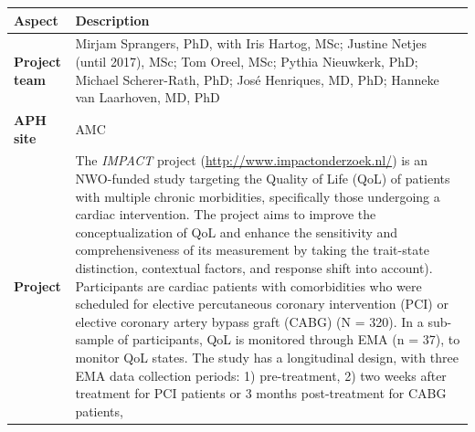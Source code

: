 \documentclass[]{book}
\begin{document}
 

\begin{longtable}[]{@{}ll@{}}
\toprule
\begin{minipage}[b]{0.25\columnwidth}\raggedright\strut
\textbf{Aspect}\strut
\end{minipage} & \begin{minipage}[b]{0.69\columnwidth}\raggedright\strut
\textbf{Description}\strut
\end{minipage}\tabularnewline
\midrule
\endhead
\begin{minipage}[t]{0.25\columnwidth}\raggedright\strut
\textbf{Project team}\strut
\end{minipage} & \begin{minipage}[t]{0.69\columnwidth}\raggedright\strut
Mirjam Sprangers, PhD, with Iris Hartog, MSc; Justine Netjes (until
2017), MSc; Tom Oreel, MSc; Pythia Nieuwkerk, PhD; Michael Scherer-Rath,
PhD; José Henriques, MD, PhD; Hanneke van Laarhoven, MD, PhD\strut
\end{minipage}\tabularnewline
\begin{minipage}[t]{0.25\columnwidth}\raggedright\strut
\textbf{APH site}\strut
\end{minipage} & \begin{minipage}[t]{0.69\columnwidth}\raggedright\strut
AMC\strut
\end{minipage}\tabularnewline
\begin{minipage}[t]{0.25\columnwidth}\raggedright\strut
\textbf{Project}\strut
\end{minipage} & \begin{minipage}[t]{0.69\columnwidth}\raggedright\strut
The \emph{IMPACT} project (\url{http://www.impactonderzoek.nl/}) is an
NWO-funded study targeting the Quality of Life (QoL) of patients with
multiple chronic morbidities, specifically those undergoing a cardiac
intervention. The project aims to improve the conceptualization of QoL
and enhance the sensitivity and comprehensiveness of its measurement by
taking the trait-state distinction, contextual factors, and response
shift into account). Participants are cardiac patients with
comorbidities who were scheduled for elective percutaneous coronary
intervention (PCI) or elective coronary artery bypass graft (CABG) (N =
320). In a sub-sample of participants, QoL is monitored through EMA (n =
37), to monitor QoL states. The study has a longitudinal design, with
three EMA data collection periods: 1) pre-treatment, 2) two weeks after
treatment for PCI patients or 3 months post-treatment for CABG patients,

\end{minipage}
\end{longtable}
\end{document}
